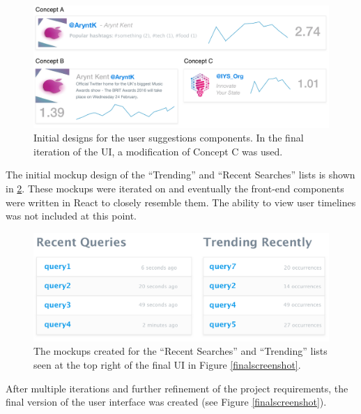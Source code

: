 \documentclass{l4proj}
\begin{document}
\begin{figure}[H]
\centering
\includegraphics[scale=0.5]{suggestionsmockups.pdf}
\caption{Initial designs for the user suggestions components. In the final iteration of the UI, a modification of Concept C was used.}
\label{suggestionsmockups}
\end{figure}
        
        The initial mockup design of the ``Trending'' and ``Recent Searches'' lists is shown in \ref{listmockups}. These mockups were iterated on and eventually the front-end components were written in React to closely resemble them. The ability to view user timelines was not included at this point.
        
\begin{figure}[H]
\centering
\includegraphics[scale=0.5]{listmockups.pdf}
\caption{The mockups created for the ``Recent Searches'' and ``Trending'' lists seen at the top right of the final UI in Figure \ref{finalscreenshot}.}
\label{listmockups}
\end{figure}    

After multiple iterations and further refinement of the project requirements, the final version of the user interface was created (see Figure \ref{finalscreenshot}).
        
\end{document}
